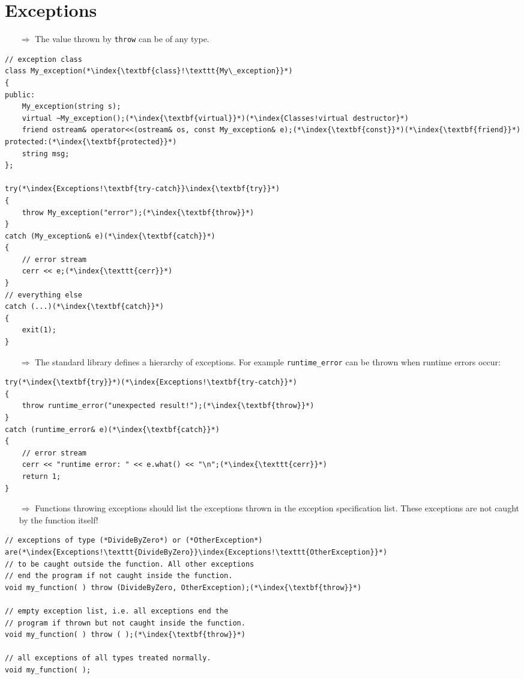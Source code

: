 \documentclass[10pt]{article}
\begin{document}
\section{Exceptions}
\small
\begin{enumerate}
\item[$\Rightarrow$] The value thrown by
\texttt{throw} can be of any type.
\end{enumerate}
\begin{lstlisting}
// exception class
class My_exception(*\index{\textbf{class}!\texttt{My\_exception}}*)
{
public:
    My_exception(string s);
    virtual ~My_exception();(*\index{\textbf{virtual}}*)(*\index{Classes!virtual destructor}*)
    friend ostream& operator<<(ostream& os, const My_exception& e);(*\index{\textbf{const}}*)(*\index{\textbf{friend}}*)
protected:(*\index{\textbf{protected}}*)
    string msg;
};

try(*\index{Exceptions!\textbf{try-catch}}\index{\textbf{try}}*)
{
    throw My_exception("error");(*\index{\textbf{throw}}*)
}
catch (My_exception& e)(*\index{\textbf{catch}}*)
{
    // error stream
    cerr << e;(*\index{\texttt{cerr}}*)
}
// everything else
catch (...)(*\index{\textbf{catch}}*)
{
    exit(1);
}
\end{lstlisting}
\begin{enumerate}
\item[$\Rightarrow$] The standard library defines a hierarchy of exceptions.  For example \texttt{runtime\_error} can be 
thrown when runtime errors occur:
\end{enumerate}
\begin{lstlisting}
try(*\index{\textbf{try}}*)(*\index{Exceptions!\textbf{try-catch}}*)
{
    throw runtime_error("unexpected result!");(*\index{\textbf{throw}}*)
}
catch (runtime_error& e)(*\index{\textbf{catch}}*)
{
    // error stream
    cerr << "runtime error: " << e.what() << "\n";(*\index{\texttt{cerr}}*)
    return 1;
}
\end{lstlisting}
\begin{enumerate}
\item[$\Rightarrow$] Functions throwing exceptions should list the exceptions thrown in
the exception specification list. These exceptions are not 
caught by the function itself!
\end{enumerate}
\begin{lstlisting}
// exceptions of type (*DivideByZero*) or (*OtherException*) are(*\index{Exceptions!\texttt{DivideByZero}}\index{Exceptions!\texttt{OtherException}}*)
// to be caught outside the function. All other exceptions 
// end the program if not caught inside the function.
void my_function( ) throw (DivideByZero, OtherException);(*\index{\textbf{throw}}*)

// empty exception list, i.e. all exceptions end the
// program if thrown but not caught inside the function.
void my_function( ) throw ( );(*\index{\textbf{throw}}*)

// all exceptions of all types treated normally.
void my_function( );
\end{lstlisting}
\end{document}
